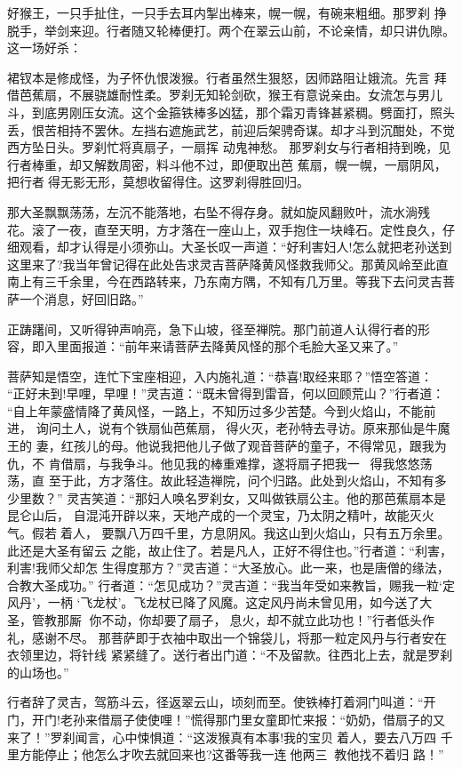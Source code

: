 好猴王，一只手扯住，一只手去耳内掣出棒来，幌一幌，有碗来粗细。那罗刹
挣脱手，举剑来迎。行者随又轮棒便打。两个在翠云山前，不论亲情，却只讲仇隙。
这一场好杀：

裙钗本是修成怪，为子怀仇恨泼猴。行者虽然生狠怒，因师路阻让娥流。先言
拜借芭蕉扇，不展骁雄耐性柔。罗刹无知轮剑砍，猴王有意说亲由。女流怎与男儿
斗，到底男刚压女流。这个金箍铁棒多凶猛，那个霜刃青锋甚紧稠。劈面打，照头
丢，恨苦相持不罢休。左挡右遮施武艺，前迎后架骋奇谋。却才斗到沉酣处，不觉
西方坠日头。罗刹忙将真扇子，一扇挥
动鬼神愁。
那罗刹女与行者相持到晚，见行者棒重，却又解数周密，料斗他不过，即便取出芭
蕉扇，幌一幌，一扇阴风，把行者得无影无形，莫想收留得住。这罗刹得胜回归。

那大圣飘飘荡荡，左沉不能落地，右坠不得存身。就如旋风翻败叶，流水淌残
花。滚了一夜，直至天明，方才落在一座山上，双手抱住一块峰石。定性良久，仔
细观看，却才认得是小须弥山。大圣长叹一声道：“好利害妇人!怎么就把老孙送到
这里来了?我当年曾记得在此处告求灵吉菩萨降黄风怪救我师父。那黄风岭至此直
南上有三千余里，今在西路转来，乃东南方隅，不知有几万里。等我下去问灵吉菩
萨一个消息，好回旧路。”

正踌躇间，又听得钟声响亮，急下山坡，径至禅院。那门前道人认得行者的形
容，即入里面报道：“前年来请菩萨去降黄风怪的那个毛脸大圣又来了。”

菩萨知是悟空，连忙下宝座相迎，入内施礼道：“恭喜!取经来耶？”悟空答道：
“正好未到!早哩，早哩！”灵吉道：“既未曾得到雷音，何以回顾荒山？”行者道：
“自上年蒙盛情降了黄风怪，一路上，不知历过多少苦楚。今到火焰山，不能前进，
询问土人，说有个铁扇仙芭蕉扇，得火灭，老孙特去寻访。原来那仙是牛魔王的
妻，红孩儿的母。他说我把他儿子做了观音菩萨的童子，不得常见，跟我为仇，不
肯借扇，与我争斗。他见我的棒重难撑，遂将扇子把我一，得我悠悠荡荡，直
至于此，方才落住。故此轻造禅院，问个归路。此处到火焰山，不知有多少里数？”
灵吉笑道：“那妇人唤名罗刹女，又叫做铁扇公主。他的那芭蕉扇本是昆仑山后，
自混沌开辟以来，天地产成的一个灵宝，乃太阴之精叶，故能灭火气。假若着人，
要飘八万四千里，方息阴风。我这山到火焰山，只有五万余里。此还是大圣有留云
之能，故止住了。若是凡人，正好不得住也。”行者道：“利害，利害!我师父却怎
生得度那方？”灵吉道：“大圣放心。此一来，也是唐僧的缘法，合教大圣成功。”
行者道：“怎见成功？”灵吉道：“我当年受如来教旨，赐我一粒‘定风丹’，一柄
‘飞龙杖’。飞龙杖已降了风魔。这定风丹尚未曾见用，如今送了大圣，管教那厮
你不动，你却要了扇子，息火，却不就立此功也！”行者低头作礼，感谢不尽。
那菩萨即于衣袖中取出一个锦袋儿，将那一粒定风丹与行者安在衣领里边，将针线
紧紧缝了。送行者出门道：“不及留款。往西北上去，就是罗刹的山场也。”

行者辞了灵吉，驾筋斗云，径返翠云山，顷刻而至。使铁棒打着洞门叫道：“开
门，开门!老孙来借扇子使使哩！”慌得那门里女童即忙来报：“奶奶，借扇子的又
来了！”罗刹闻言，心中悚惧道：“这泼猴真有本事!我的宝贝着人，要去八万四
千里方能停止；他怎么才吹去就回来也?这番等我一连他两三，教他找不着归
路！”

